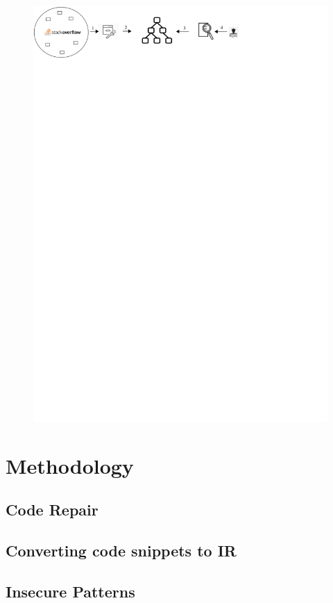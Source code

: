 \documentclass[sigconf]{acmart}
\begin{document}
\begin{figure}[h]
  \centering
  \includegraphics[width=\linewidth]{Figures/overall-process-eps-converted-to.pdf}
  \caption{}
  \Description{}
\end{figure}

\section{Methodology}
\subsection{Code Repair}
\subsection{Converting code snippets to IR}
\subsection{Insecure Patterns}
\end{document}
